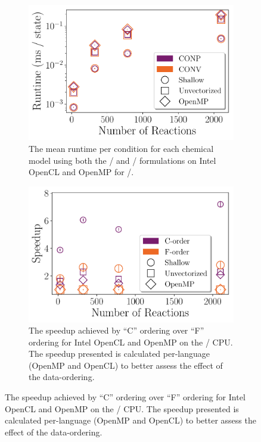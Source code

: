 \documentclass[12pt,number,sort&compress,preprint]{elsarticle}
\begin{document}
\begin{figure}[htbp]
   \centering
  \begin{subfigure}[t]{0.48\linewidth}
      \includegraphics[width=\textwidth]{source_conpvsconv.pdf}
      \caption{The mean runtime per condition for each chemical model using both the \conp/ and \conv/ formulations on Intel OpenCL and OpenMP for \avx/.}
      \label{F:source_conpvsconv}
  \end{subfigure}
  \hfill
  \begin{subfigure}[t]{0.48\linewidth}
      \includegraphics[width=\textwidth]{source_cvsf.pdf}
      \caption{The speedup achieved by ``C'' ordering over ``F'' ordering for Intel OpenCL and OpenMP on the \avx/ CPU.  The speedup presented is calculated per-language (OpenMP and OpenCL) to better assess the effect of the data-ordering.}
      \label{F:source_cvsf}
  \end{subfigure}

\end{figure}
\end{document}

